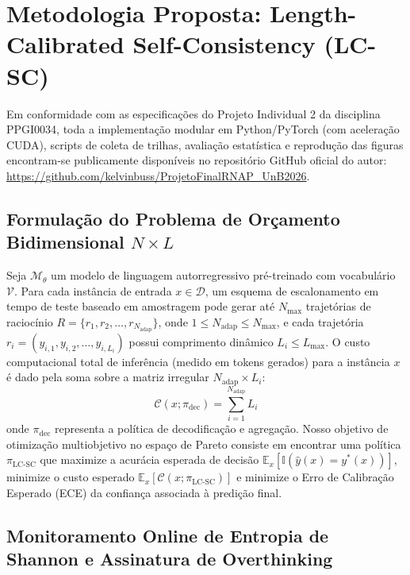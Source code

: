 \documentclass[9pt,conference]{IEEEtran}
\begin{document}
\section{Metodologia Proposta: Length-Calibrated Self-Consistency (LC-SC)}

Em conformidade com as especifica\c{c}\~{o}es do Projeto Individual 2 da disciplina PPGI0034, toda a implementa\c{c}\~{a}o modular em Python/PyTorch (com acelera\c{c}\~{a}o CUDA), scripts de coleta de trilhas, avalia\c{c}\~{a}o estat\'{i}stica e reprodu\c{c}\~{a}o das figuras encontram-se publicamente dispon\'{i}veis no reposit\'{o}rio GitHub oficial do autor: \url{https://github.com/kelvinbuss/ProjetoFinalRNAP_UnB2026}.

\subsection{Formula\c{c}\~{a}o do Problema de Or\c{c}amento Bidimensional $N \times L$}

Seja $\mathcal{M}_\theta$ um modelo de linguagem autorregressivo pr\'{e}-treinado com vocabul\'{a}rio $\mathcal{V}$. Para cada inst\^{a}ncia de entrada $x \in \mathcal{D}$, um esquema de escalonamento em tempo de teste baseado em amostragem pode gerar at\'{e} $N_{\max}$ trajet\'{o}rias de racioc\'{i}nio $R = \{r_1, r_2, \dots, r_{N_{\text{adap}}}\}$, onde $1 \le N_{\text{adap}} \le N_{\max}$, e cada trajet\'{o}ria $r_i = (y_{i,1}, y_{i,2}, \dots, y_{i,L_i})$ possui comprimento din\^{a}mico $L_i \le L_{\max}$. O custo computacional total de infer\^{e}ncia (medido em tokens gerados) para a inst\^{a}ncia $x$ \'{e} dado pela soma sobre a matriz irregular $N_{\text{adap}} \times L_i$:
\begin{equation}
\mathcal{C}(x; \pi_{\text{dec}}) = \sum_{i=1}^{N_{\text{adap}}} L_i
\label{eq:total_cost}
\end{equation}
onde $\pi_{\text{dec}}$ representa a pol\'{i}tica de decodifica\c{c}\~{a}o e agrega\c{c}\~{a}o. Nosso objetivo de otimiza\c{c}\~{a}o multiobjetivo no espa\c{c}o de Pareto consiste em encontrar uma pol\'{i}tica $\pi_{\text{LC-SC}}$ que maximize a acur\'{a}cia esperada de decis\~{a}o $\mathbb{E}_{x}[\mathbb{I}(\hat{y}(x) = y^*(x))]$, minimize o custo esperado $\mathbb{E}_{x}[\mathcal{C}(x; \pi_{\text{LC-SC}})]$ e minimize o Erro de Calibra\c{c}\~{a}o Esperado (ECE) da confian\c{c}a associada \`{a} predi\c{c}\~{a}o final.

\subsection{Monitoramento Online de Entropia de Shannon e Assinatura de Overthinking}
\end{document}
